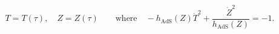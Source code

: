 \begin{equation}
T=T(\tau), \quad Z=Z(\tau) \qquad \textrm{where} \quad
-h_\textrm{AdS}(Z)\dot T^2+\frac{\dot Z^2}{h_\textrm{AdS}(Z)}=-1.
\end{equation}

